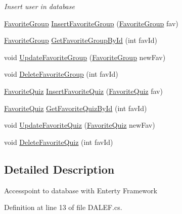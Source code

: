 \begin{DoxyCompactItemize}
\begin{DoxyCompactList}\small\item\em Insert user in database \end{DoxyCompactList}\item 
\hyperlink{class_website_1_1_models_1_1_favorite_group}{Favorite\+Group} \hyperlink{class_website_1_1_models_1_1_d_a_l_e_f_a435251807de4ec80d68ff4c3a3832a8e}{Insert\+Favorite\+Group} (\hyperlink{class_website_1_1_models_1_1_favorite_group}{Favorite\+Group} fav)
\item 
\hyperlink{class_website_1_1_models_1_1_favorite_group}{Favorite\+Group} \hyperlink{class_website_1_1_models_1_1_d_a_l_e_f_a4c275b3419e328e4dfb747b00945632a}{Get\+Favorite\+Group\+By\+Id} (int fav\+Id)
\item 
void \hyperlink{class_website_1_1_models_1_1_d_a_l_e_f_a00134c120bfb470c5bce2b60c03938c5}{Update\+Favorite\+Group} (\hyperlink{class_website_1_1_models_1_1_favorite_group}{Favorite\+Group} new\+Fav)
\item 
void \hyperlink{class_website_1_1_models_1_1_d_a_l_e_f_a213e2e317ae3018e3f1db927a32713c1}{Delete\+Favorite\+Group} (int fav\+Id)
\item 
\hyperlink{class_website_1_1_models_1_1_favorite_quiz}{Favorite\+Quiz} \hyperlink{class_website_1_1_models_1_1_d_a_l_e_f_a908e50ff8850426e81edf41f0f94c5e4}{Insert\+Favorite\+Quiz} (\hyperlink{class_website_1_1_models_1_1_favorite_quiz}{Favorite\+Quiz} fav)
\item 
\hyperlink{class_website_1_1_models_1_1_favorite_quiz}{Favorite\+Quiz} \hyperlink{class_website_1_1_models_1_1_d_a_l_e_f_a46cf7814a1f089bb8949f360637a569e}{Get\+Favorite\+Quiz\+By\+Id} (int fav\+Id)
\item 
void \hyperlink{class_website_1_1_models_1_1_d_a_l_e_f_abda6b5187b4950123409698d868d33be}{Update\+Favorite\+Quiz} (\hyperlink{class_website_1_1_models_1_1_favorite_quiz}{Favorite\+Quiz} new\+Fav)
\item 
void \hyperlink{class_website_1_1_models_1_1_d_a_l_e_f_a4fd3763df400467c09141afe32fca189}{Delete\+Favorite\+Quiz} (int fav\+Id)
\end{DoxyCompactItemize}


\subsection{Detailed Description}
Accesspoint to database with Enterty Framework 



Definition at line 13 of file D\+A\+L\+E\+F.\+cs.



